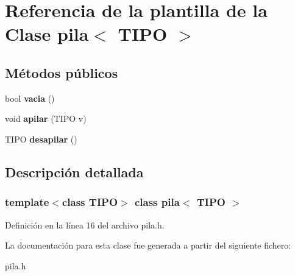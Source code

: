 \hypertarget{classpila}{}\section{Referencia de la plantilla de la Clase pila$<$ T\+I\+PO $>$}
\label{classpila}
\subsection*{Métodos públicos}
\begin{DoxyCompactItemize}
\item 
\mbox{\label{classpila_a18755d1505a3d0946c1978c571cd456c}} 
bool {\bfseries vacia} ()
\item 
\mbox{\label{classpila_aadc65c1c0f7d355204aa80d0ca10b688}} 
void {\bfseries apilar} (T\+I\+PO v)
\item 
\mbox{\label{classpila_a6024dd235a660c7806e47a36194b97cc}} 
T\+I\+PO {\bfseries desapilar} ()
\end{DoxyCompactItemize}


\subsection{Descripción detallada}
\subsubsection*{template$<$class T\+I\+PO$>$\newline
class pila$<$ T\+I\+P\+O $>$}



Definición en la línea 16 del archivo pila.\+h.



La documentación para esta clase fue generada a partir del siguiente fichero\+:\begin{DoxyCompactItemize}
\item 
pila.\+h\end{DoxyCompactItemize}
